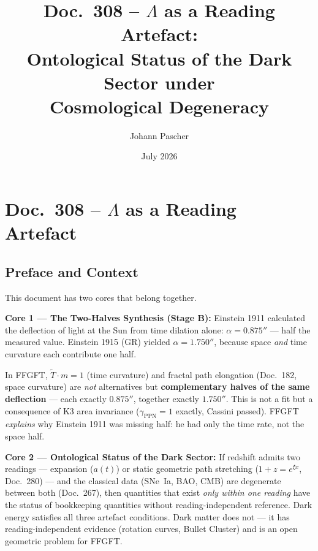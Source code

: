 \documentclass[11pt]{report}
\title{Doc.~308 -- $\Lambda$ as a Reading Artefact:\\
Ontological Status of the Dark Sector under\\
Cosmological Degeneracy}
\author{Johann Pascher}
\date{July 2026}
\begin{document}
\maketitle
\tableofcontents

\chapter*{Doc.~308 -- $\Lambda$ as a Reading Artefact}

\section*{Preface and Context}

This document has two cores that belong together.

\medskip
\noindent\textbf{Core 1 — The Two-Halves Synthesis (Stage B):}
Einstein 1911 calculated the deflection of light at the Sun from
time dilation alone: $\alpha = 0.875''$ — half the measured value.
Einstein 1915 (GR) yielded $\alpha = 1.750''$, because space
\emph{and} time curvature each contribute one half.

In FFGFT, $\tilde T \cdot m = 1$ (time curvature) and fractal path
elongation (Doc.~182, space curvature) are \emph{not} alternatives
but \textbf{complementary halves of the same deflection} — each
exactly $0.875''$, together exactly $1.750''$. This is not a fit but
a consequence of K3 area invariance ($\gamma_\text{PPN} = 1$ exactly,
Cassini passed). FFGFT \emph{explains} why Einstein 1911 was missing
half: he had only the time rate, not the space half.

\medskip
\noindent\textbf{Core 2 — Ontological Status of the Dark Sector:}
If redshift admits two readings — expansion ($a(t)$) or static
geometric path stretching ($1+z = e^{\xi x}$, Doc.~280) — and the
classical data (SNe~Ia, BAO, CMB) are degenerate between both
(Doc.~267), then quantities that exist \emph{only within one reading}
have the status of bookkeeping quantities without reading-independent
reference.
Dark energy satisfies all three artefact conditions. Dark matter does
not — it has reading-independent evidence (rotation curves, Bullet
Cluster) and is an open geometric problem for FFGFT.
\end{document}
